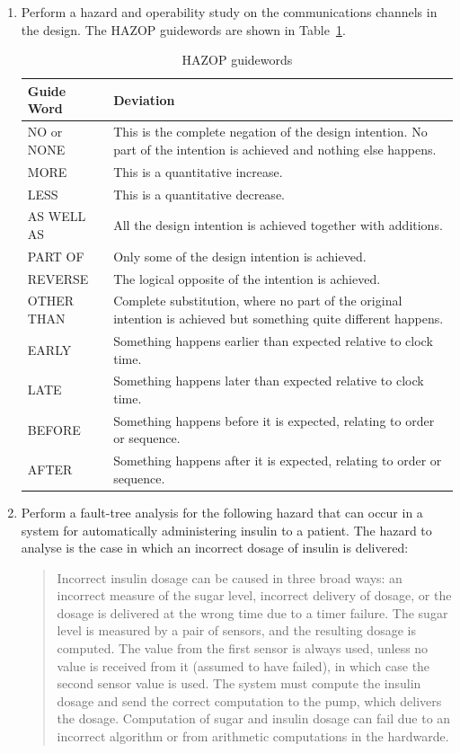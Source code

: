 \documentclass{article}
\begin{document}
\begin{enumerate}

 \item Perform a hazard and operability study on the communications channels
in the design. The HAZOP guidewords are shown in Table~\ref{tab:hazop-guidewords}.

\begin{table}[!h]
\centering
\begin{tabular}{lp{11cm}}
 \toprule
      \textbf{Guide Word} & \textbf{Deviation}\\
 \midrule
      NO or NONE & This is the complete negation of the design intention. No
      part of the intention is achieved and nothing else happens.\\
      MORE & This is a quantitative increase.\\
      LESS & This is a quantitative decrease.\\
      AS WELL AS & All the design intention is achieved together with additions.\\
      PART OF & Only some of the design intention is achieved. \\
      REVERSE & The logical opposite of the intention is achieved.\\
      OTHER THAN & Complete substitution, where no part of the original
      intention is achieved but something quite different happens. \\
    EARLY  & Something happens earlier than expected relative to clock time.\\
    LATE & Something happens later than expected relative to clock time. \\
    BEFORE & Something happens before it is expected, relating to
    order or sequence.\\
    AFTER & Something happens after it is expected, relating to order or sequence.\\
\bottomrule
\end{tabular}
\caption{HAZOP guidewords}
\label{tab:hazop-guidewords}
\end{table}

 \item Perform a fault-tree analysis for the following hazard that can occur in a system for automatically administering insulin to a patient. The hazard to analyse is the case in which an incorrect dosage of insulin is delivered:

\begin{quote}
 Incorrect insulin dosage can be caused in three broad ways: an incorrect measure of the sugar level, incorrect delivery of dosage, or the dosage is delivered at the wrong time due to a timer failure. The sugar level is measured by a pair of sensors, and the resulting dosage is computed. The value from the first sensor is always used, unless no value is received from it (assumed to have failed), in which case the second sensor value is used.  The system must compute the insulin dosage and send the correct computation to the pump, which delivers the dosage.
Computation of sugar and insulin dosage can fail due to an incorrect algorithm or from arithmetic computations in the hardwarde.
\end{quote}


\end{enumerate}
\end{document}
